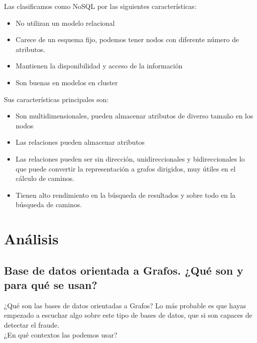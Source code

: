 \documentclass[preprint,12pt]{elsarticle}
\begin{document}
Las clasificamos como NoSQL por las siguientes características:
\begin{itemize}
     \item No utilizan un modelo relacional 
     \item Carece de un esquema fijo, podemos tener nodos con diferente número de atributos.  
     \item Mantienen la disponibilidad y acceso de la información
     \item Son buenas en modelos en cluster
\end{itemize}

Sus características principales son:
\begin{itemize}
 \item Son multidimensionales, pueden almacenar atributos de diverso tamaño en los nodos
 \item Las relaciones pueden almacenar atributos
 \item Las relaciones pueden ser sin dirección, unidireccionales y bidireccionales lo que puede convertir la representación a grafos dirigidos, muy útiles en el cálculo de caminos.
 \item Tienen alto rendimiento en la búsqueda de resultados y sobre todo en la búsqueda de caminos.
\end{itemize}



 



\section{Análisis}

\subsection{\textbf{Base de datos orientada a Grafos. ¿Qué son y para qué se usan?}}
¿Qué son las bases de datos orientadas a Grafos? Lo más probable es que hayas empezado a escuchar algo sobre este tipo de bases de datos, que si son capaces de detectar el fraude.\\

¿En qué contextos las podemos usar?
\end{document}
